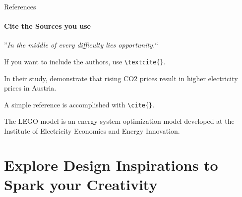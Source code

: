 \documentclass[aspectratio=169]{beamer}
\begin{document}
\begin{frame}
\end{frame}


\begin{frame}{References}
    \framesubtitle{Cite the Sources you use}

  \begin{coloredblock}[grey]
    \centering
      ”\textit{In the middle of every difficulty lies opportunity.}“
      
      \vspace{0.7cm}
      \scriptsize \textcite{Einstein2018}
  \end{coloredblock}

  \begin{coloredblock}
      If you want to include the authors, use \texttt{\textbackslash textcite\{\}}.

      \vspace{0.5cm}
      In their study, \textbf{\textcite{gaugl2023}} demonstrate that rising CO2 prices result in higher electricity prices in Austria.
  \end{coloredblock}

  \begin{coloredblock}
      A simple reference is accomplished with \texttt{\textbackslash cite\{\}}.

      \vspace{0.5cm}
      The LEGO model is an energy system optimization model developed at the Institute of Electricity Economics and Energy Innovation. \textbf{\cite{wogrin2022}}
  \end{coloredblock}

\end{frame}

\section{Explore \textbf{Design Inspirations} to Spark  your Creativity}

\end{document}
